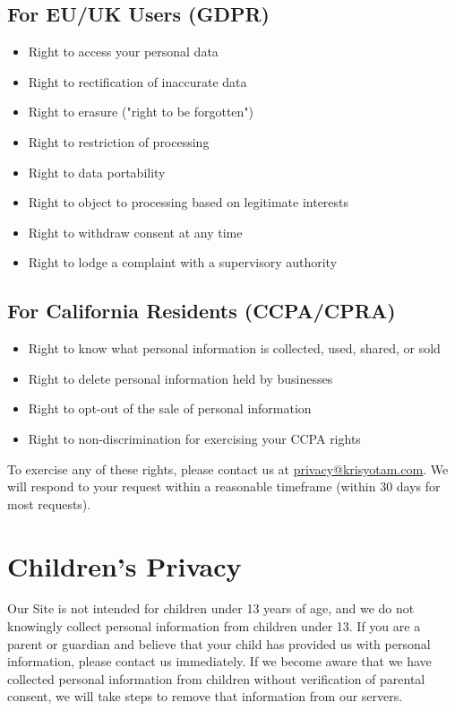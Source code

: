 \documentclass[11pt]{article}
\begin{document}
\subsection{For EU/UK Users (GDPR)}
\begin{itemize}
  \item Right to access your personal data
  \item Right to rectification of inaccurate data
  \item Right to erasure ("right to be forgotten")
  \item Right to restriction of processing
  \item Right to data portability
  \item Right to object to processing based on legitimate interests
  \item Right to withdraw consent at any time
  \item Right to lodge a complaint with a supervisory authority
\end{itemize}

\subsection{For California Residents (CCPA/CPRA)}
\begin{itemize}
  \item Right to know what personal information is collected, used, shared, or sold
  \item Right to delete personal information held by businesses
  \item Right to opt-out of the sale of personal information
  \item Right to non-discrimination for exercising your CCPA rights
\end{itemize}

To exercise any of these rights, please contact us at \href{mailto:privacy@krisyotam.com}{privacy@krisyotam.com}. We will respond to your request within a reasonable timeframe (within 30 days for most requests).

\section{Children's Privacy}

Our Site is not intended for children under 13 years of age, and we do not knowingly collect personal information from children under 13. If you are a parent or guardian and believe that your child has provided us with personal information, please contact us immediately. If we become aware that we have collected personal information from children without verification of parental consent, we will take steps to remove that information from our servers.
\end{document}
